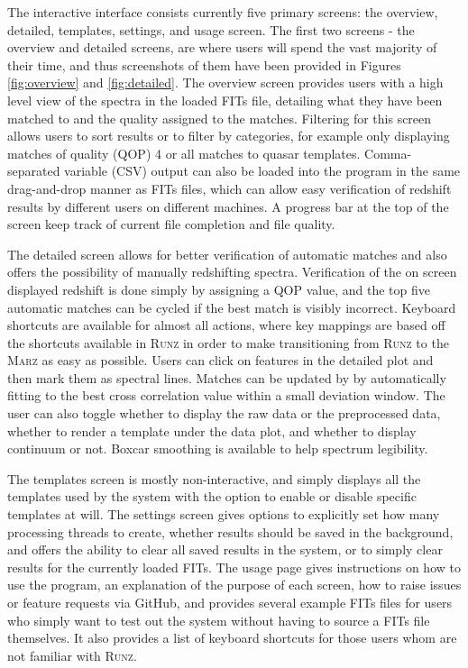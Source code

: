 \documentclass[iop]{emulateapj}
\newcommand{\tam}{\color{blue}}
\newcommand{\runz}{\textsc{Runz}}
\newcommand{\thesisname}{\textsc{Marz}}
\begin{document}
The {\tam interactive} interface consists currently five primary screens: the overview, detailed, templates, settings, and usage screen. The first two screens - the overview and detailed screens, are where users will spend the vast majority of their time, and thus screenshots of them have been provided in Figures \ref{fig:overview} and \ref{fig:detailed}. The overview screen provides users with a high level view of the spectra in the loaded FITs file, detailing what they have been matched to and the quality assigned to the matches. Filtering for this screen allows users to sort results or to filter by categories, for example only displaying matches of quality (QOP) 4 or all matches to quasar templates. {\tam Comma-separated variable} (CSV) output can also be loaded into the program in the same drag-and-drop manner as FITs files, which can allow easy verification of redshift results by different users on different machines. A progress bar at the top of the screen keep track of current file completion and file quality.

The detailed screen allows for better verification of automatic matches and also offers the possibility of manually redshifting spectra. Verification of the on screen displayed redshift is done simply by assigning a QOP value, and the top five automatic matches can be cycled if the best match is visibly incorrect. Keyboard shortcuts are available for almost all actions, where key mappings are based off the shortcuts available in \runz{} in order to make transitioning from \runz{} to the \thesisname{} as easy as possible. Users can click on features in the detailed plot and then mark them as spectral lines. Matches can be updated by by automatically fitting to the best cross correlation value within a small deviation window. The user can also toggle whether to display the raw data or the preprocessed data, whether to render a template under the data plot, and {\tam whether to display} continuum or not. Boxcar smoothing is available to help spectrum legibility.

The templates screen is mostly non-interactive, and simply displays all the templates used by the system with the option to enable or disable specific templates at will. The settings screen gives options to explicitly set how many processing threads to create, whether results should be saved in the background, and offers the ability to clear all saved results in the system, or to simply clear results for the currently loaded FITs. The usage page gives instructions on how to use the program, an explanation of the purpose of each screen, how to raise issues or feature requests via GitHub, and provides several example FITs files for users who simply want to test out the system without having to source a FITs file themselves. It also provides a list of keyboard shortcuts for those users whom are not familiar with \runz{}.
\end{document}
